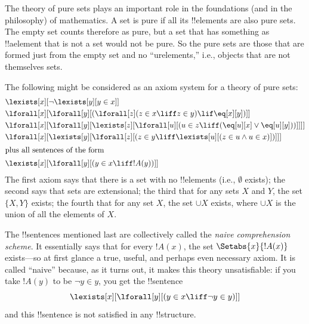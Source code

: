\begin{ex}
The theory of pure sets plays an important role in the foundations
(and in the philosophy) of mathematics.  A set is pure if all its
!!{element}s are also pure sets.  The empty set counts therefore as
pure, but a set that has something as !!a{element} that is not a set
would not be pure.  So the pure sets are those that are formed just
from the empty set and no ``urelements,'' i.e., objects that are not
themselves sets.

The following might be considered as an axiom system for a theory of
pure sets:
\begin{align*}
& \lexists[x][\lnot \lexists[y][y \in x]]\\
& \lforall[x][\lforall[y][(\lforall[z](z \in x \liff z \in y) \lif 
\eq[x][y])]]\\
& \lforall[x][\lforall[y][\lexists[z][\lforall[u][(u \in z \liff
(\eq[u][x] \lor \eq[u][y]))]]]]\\
& \lforall[x][\lexists[y][\lforall[z][(z \in y \liff \lexists[u][(z \in
        u \land u \in x)])]]]\\
\intertext{plus all sentences of the form} &
\lexists[x][\lforall[y][(y \in x \liff !A(y))]]
\end{align*}
The first axiom says that there is a set with no !!{element}s (i.e.,
$\emptyset$ exists); the second says that sets are extensional; the
third that for any sets $X$ and $Y$, the set $\{X, Y\}$ exists; the
fourth that for any set $X$, the set $\cup X$ exists, where $\cup X$ is the 
union of all the elements of $X$.

The !!{sentence}s mentioned last are collectively called the
\emph{naive comprehension scheme}.  It essentially says that for every
$!A(x)$, the set $\Setabs{x}{!A(x)}$ exists---so at first glance a
true, useful, and perhaps even necessary axiom.  It is called ``naive''
because, as it turns out, it makes this theory unsatisfiable: if you
take $!A(y)$ to be $\lnot y \in y$, you get the !!{sentence}
\[
\lexists[x][\lforall[y][(y \in x \liff \lnot y \in y)]]
\]
and this !!{sentence} is not satisfied in any !!{structure}.
\end{ex}

